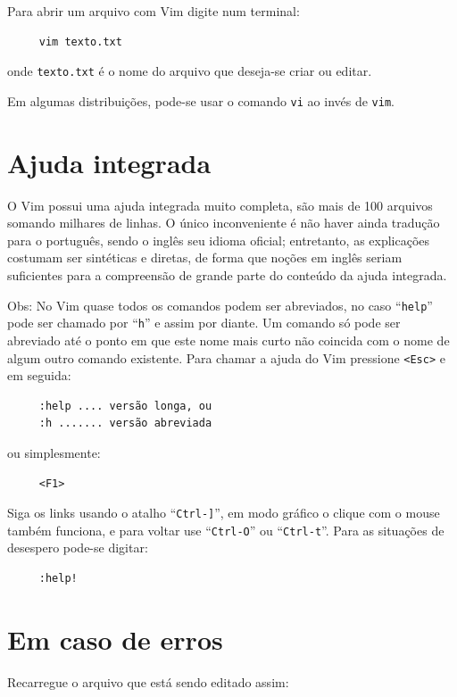 Para abrir um arquivo com Vim digite num terminal:
%
\begin{verbatim}
     vim texto.txt
\end{verbatim}
onde {\tt texto.txt} é o nome do arquivo que deseja-se criar ou editar.

Em algumas distribuições, pode-se usar o comando {\tt vi} ao invés de {\tt vim}.

\section{Ajuda integrada}
%
O Vim possui uma ajuda integrada muito completa, são mais
de 100 arquivos somando milhares de linhas. O único inconveniente é não haver ainda
tradução para o português, sendo o inglês seu idioma oficial; entretanto, as explicações
costumam ser sintéticas e diretas, de forma que noções em inglês seriam
suficientes para a compreensão de grande parte do conteúdo da ajuda integrada.

Obs: No Vim quase todos os comandos podem ser abreviados, no caso
``\verb+help+'' pode ser chamado por ``\verb+h+'' e assim por diante. Um
comando só pode ser abreviado até o ponto em que este nome mais curto não
coincida com o nome de algum outro comando existente.  Para chamar a ajuda do
Vim pressione \verb|<Esc>| e em seguida:
%
\begin{verbatim}
     :help .... versão longa, ou
     :h ....... versão abreviada
\end{verbatim}
%
ou simplesmente:
%
\begin{verbatim}
     <F1>
\end{verbatim}

Siga os links usando o atalho ``\verb|Ctrl-]|'', em modo gráfico o clique com o
mouse também funciona, e para voltar use ``\verb|Ctrl-O|'' ou
``\verb|Ctrl-t|''. Para as situações de desespero pode-se digitar:

\begin{verbatim}
     :help!
\end{verbatim}

\section{Em caso de erros }\label{Em caso de erros }
%
Recarregue o arquivo que está sendo editado assim:

